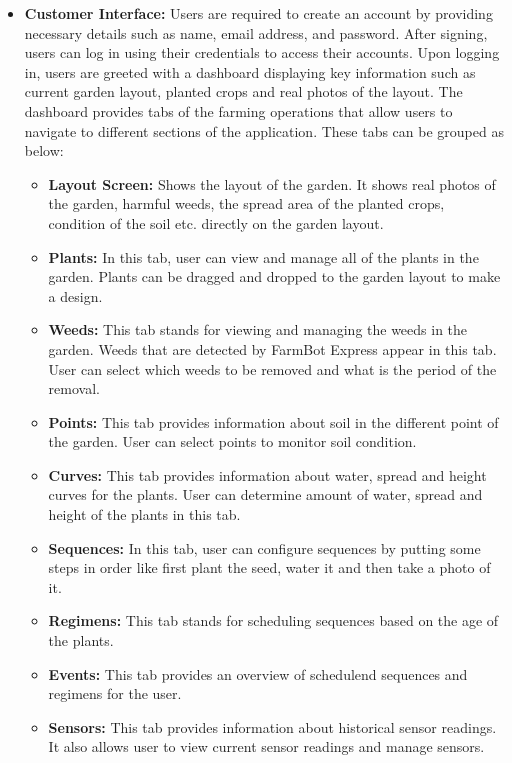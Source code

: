 \begin{itemize}
    \item \textbf{Customer Interface: } Users are required to create an account by providing necessary details such as name, email address, and password. After signing, users can log in using their credentials to access their accounts.
    Upon logging in, users are greeted with a dashboard displaying key information such as current garden layout, planted crops and real photos of the layout. The dashboard provides tabs of the farming operations that allow users to navigate to different sections of the application. These tabs can be grouped as below:
    	\begin{itemize}
 	   \item \textbf{Layout Screen: } Shows the layout of the garden. It shows real photos of the garden, harmful weeds, the spread area of the planted crops, condition of the soil etc. directly on the garden layout.  
    	   \item \textbf{Plants: } In this tab, user can view and manage all of the plants in the garden. Plants can be dragged and dropped to the garden layout to make a design.
    	   \item \textbf{Weeds: } This tab stands for viewing and managing the weeds in the garden. Weeds that are detected by FarmBot Express appear in this tab. User can select which weeds to be removed and what is the period of the removal.
    	   \item \textbf{Points: } This tab provides information about soil in the different point of the garden. User can select points to monitor soil condition.
    	   \item \textbf{Curves: } This tab provides information about water, spread and height curves for the plants. User can determine amount of water, spread and height of the plants in this tab.
    	   \item \textbf{Sequences: } In this tab, user can configure sequences by putting some steps in order like first plant the seed, water it and then take a photo of it.
    	   \item \textbf{Regimens: } This tab stands for scheduling sequences based on the age of the plants.
    	   \item \textbf{Events: } This tab provides an overview of schedulend sequences and regimens for the user.
    	   \item \textbf{Sensors: } This tab provides information about historical sensor readings. It also allows user to view current sensor readings and manage sensors.

\end{itemize}
\end{itemize}
